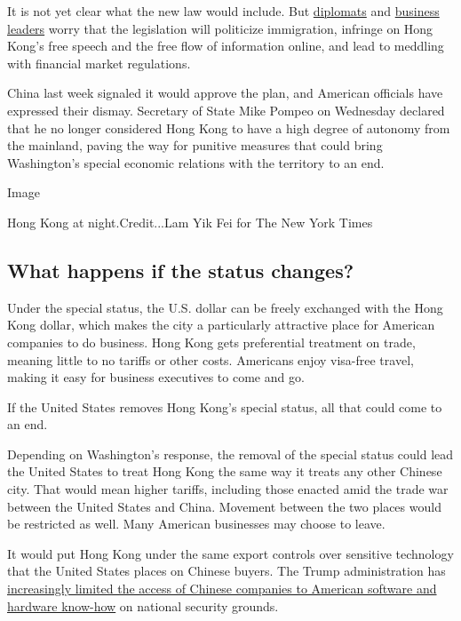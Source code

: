 It is not yet clear what the new law would include. But
\href{https://www.nytimes3xbfgragh.onion/2020/05/27/us/politics/china-hong-kong-pompeo-trade.html?action=click\&module=Top\%20Stories\&pgtype=Homepage}{diplomats}
and
\href{https://www.nytimes3xbfgragh.onion/2020/05/22/business/hong-kong-business-china.html}{business
leaders} worry that the legislation will politicize immigration,
infringe on Hong Kong's free speech and the free flow of information
online, and lead to meddling with financial market regulations.

China last week signaled it would approve the plan, and American
officials have expressed their dismay. Secretary of State Mike Pompeo on
Wednesday declared that he no longer considered Hong Kong to have a high
degree of autonomy from the mainland, paving the way for punitive
measures that could bring Washington's special economic relations with
the territory to an end.

Image

Hong Kong at night.Credit...Lam Yik Fei for The New York Times

\hypertarget{what-happens-if-the-status-changes}{%
\subsection{What happens if the status
changes?}\label{what-happens-if-the-status-changes}}

Under the special status, the U.S. dollar can be freely exchanged with
the Hong Kong dollar, which makes the city a particularly attractive
place for American companies to do business. Hong Kong gets preferential
treatment on trade, meaning little to no tariffs or other costs.
Americans enjoy visa-free travel, making it easy for business executives
to come and go.

If the United States removes Hong Kong's special status, all that could
come to an end.

Depending on Washington's response, the removal of the special status
could lead the United States to treat Hong Kong the same way it treats
any other Chinese city. That would mean higher tariffs, including those
enacted amid the trade war between the United States and China. Movement
between the two places would be restricted as well. Many American
businesses may choose to leave.

It would put Hong Kong under the same export controls over sensitive
technology that the United States places on Chinese buyers. The Trump
administration has
\href{https://www.nytimes3xbfgragh.onion/2020/05/15/business/economy/commerce-department-huawei.html}{increasingly
limited the access of Chinese companies to American software and
hardware know-how} on national security grounds.

